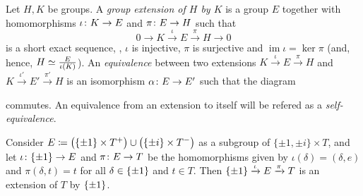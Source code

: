 \begin{defi}
    Let $H, K$ be groups. 
    A \emph{group extension of $H$ by $K$} is a group $E$ together with homomorphisms $\iota\colon K \to E$ and $\pi\colon E \to H$ such that 
    \begin{equation}\label{eq:short-exact-sequence}
        0 \rightarrow K \xrightarrow{\iota} E \xrightarrow{\pi} H \rightarrow 0
    \end{equation}
    is a short exact sequence, \ie,
    $\iota$ is injective, $\pi$ is surjective and $\operatorname{im} \iota = \ker \pi$ (and, hence, $H \simeq \frac{E}{\iota(K)}$). 
    An \emph{equivalence} between two extensions $K \xrightarrow{\iota} E \xrightarrow{\pi} H$ and $K \xrightarrow{\iota'} E' \xrightarrow{\pi'} H$ is an isomorphism $\alpha\colon E \to E'$ such that the diagram
	\begin{center}
	\end{center}
	commutes. 
	An equivalence from an extension to itself will be refered as a \emph{self-equivalence}.
\end{defi}

\begin{ex}\label{ex:main-extension}
    Consider $E \coloneqq \big(\{ \pm 1 \} \times T^+\big) \cup \big(\{\pm i\} \times T^-\big)$ as a subgroup of $\{ \pm 1, \pm i \} \times T$, and let $\iota\colon \{ \pm 1 \} \to E$ and $\pi\colon E \to T$ be the homomorphisms given by $\iota(\delta) = (\delta, e)$ and $\pi (\delta, t) = t$ for all $\delta \in \{ \pm 1 \}$ and $t\in T$. 
    Then $\{ \pm 1 \} \xrightarrow{\iota} E \xrightarrow{\pi} T$ is an extension of $T$ by $\{ \pm 1 \}$.
\end{ex}

